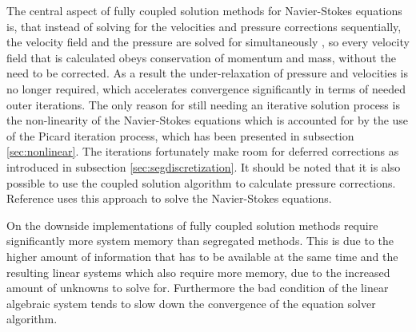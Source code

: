 The central aspect of fully coupled solution methods for Navier-Stokes equations is, that instead of solving for the velocities and pressure corrections sequentially, the velocity field and the pressure are solved for simultaneously \cite{schaefer99}, so every velocity field that is calculated obeys conservation of momentum and mass, without the need to be corrected. As a result the under-relaxation of pressure and velocities is no longer required, which accelerates convergence significantly in terms of needed outer iterations. The only reason for still needing an iterative solution process is the non-linearity of the Navier-Stokes equations which is accounted for by the use of the Picard iteration process, which has been presented in subsection \ref{sec:nonlinear}. The iterations fortunately make room for deferred corrections as introduced in subsection \ref{sec:segdiscretization}. It should be noted that it is also possible to use the coupled solution algorithm to calculate pressure corrections. Reference \cite{klaij13} uses this approach to solve the Navier-Stokes equations.

On the downside implementations of fully coupled solution methods require significantly more system memory than segregated methods. This is due to the higher amount of information that has to be available at the same time and the resulting linear systems which also require more memory, due to the increased amount of unknowns to solve for. Furthermore the bad condition of the linear algebraic system \cite{schaefer99} tends to slow down the convergence of the equation solver algorithm.

